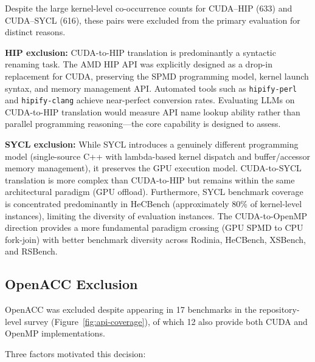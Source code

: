 Despite the large kernel-level co-occurrence counts for CUDA--HIP (633) and CUDA--SYCL (616), these pairs were excluded from the primary evaluation for distinct reasons.

\textbf{HIP exclusion:} CUDA-to-HIP translation is predominantly a syntactic renaming task. The AMD HIP API was explicitly designed as a drop-in replacement for CUDA, preserving the SPMD programming model, kernel launch syntax, and memory management API. Automated tools such as \texttt{hipify-perl} and \texttt{hipify-clang} achieve near-perfect conversion rates. Evaluating LLMs on CUDA-to-HIP translation would measure API name lookup ability rather than parallel programming reasoning---the core capability \parbench{} is designed to
assess.

\textbf{SYCL exclusion:} While SYCL introduces a genuinely different programming model (single-source C++ with lambda-based kernel dispatch and buffer/accessor memory management), it preserves the GPU execution model. CUDA-to-SYCL translation is more complex than CUDA-to-HIP but remains within the same architectural paradigm (GPU offload). Furthermore, SYCL benchmark coverage is concentrated predominantly in HeCBench (approximately 80\% of kernel-level instances), limiting the diversity of evaluation instances. The CUDA-to-OpenMP direction provides a more fundamental paradigm crossing (GPU SPMD to CPU fork-join) with better benchmark diversity across Rodinia, HeCBench, XSBench, and RSBench.

\subsection{OpenACC Exclusion}
\label{sec:appendix-b4}

OpenACC was excluded despite appearing in 17 benchmarks in the repository-level survey (Figure~\ref{fig:api-coverage}), of which 12 also provide both CUDA and OpenMP implementations. 

Three factors motivated this decision:

